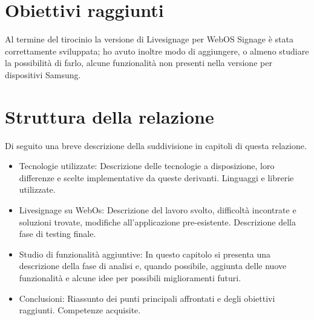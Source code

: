 
\section{Obiettivi raggiunti}

Al termine del tirocinio la versione di Livesignage per WebOS Signage è stata correttamente sviluppata; ho avuto inoltre modo di aggiungere, o almeno studiare la possibilità di farlo, alcune funzionalità non presenti nella versione per dispositivi Samsung. 

\section{Struttura della relazione}
Di seguito una breve descrizione della suddivisione in capitoli di questa relazione.
\begin{itemize}
    \item Tecnologie utilizzate: Descrizione delle tecnologie a disposizione, loro differenze e scelte implementative da queste derivanti. Linguaggi e librerie utilizzate.
    \item Livesignage su WebOs: Descrizione del lavoro svolto, difficoltà incontrate e soluzioni trovate, modifiche all'applicazione pre-esistente. Descrizione della fase di testing finale.
    \item Studio di funzionalità aggiuntive: In questo capitolo si presenta una descrizione della fase di analisi e, quando possibile, aggiunta delle nuove funzionalità e alcune idee per possibili miglioramenti futuri.
    \item Conclusioni: Riassunto dei punti principali affrontati e degli obiettivi raggiunti. Competenze acquisite.
\end{itemize}